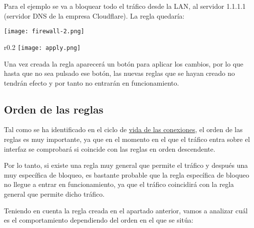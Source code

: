 Para el ejemplo se va a bloquear todo el tráfico desde la LAN, al servidor 1.1.1.1 (servidor DNS de la empresa Cloudflare). La regla quedaría:

\begin{center}
    \vspace{-10pt}
    \texttt{[image: firewall-2.png]}
    \vspace{-20pt}
\end{center}


\begin{wrapfigure}{r}{0.2\linewidth}
    \centering
    \vspace{-10pt}
    \texttt{[image: apply.png]}
\end{wrapfigure}
Una vez creada la regla aparecerá un botón para aplicar los cambios, por lo que hasta que no sea pulsado ese botón, las nuevas reglas que se hayan creado no tendrán efecto y por tanto no entrarán en funcionamiento.


\subsection{Orden de las reglas}
Tal como se ha identificado en el ciclo de \hyperlink{ciclo_vida_conexiones}{vida de las conexiones}, el orden de las reglas es muy importante, ya que en el momento en el que el tráfico entra sobre el interfaz se comprobará si coincide con las reglas en orden descendente.

Por lo tanto, si existe una regla muy general que permite el tráfico y después una muy específica de bloqueo, es bastante probable que la regla específica de bloqueo no llegue a entrar en funcionamiento, ya que el tráfico coincidirá con la regla general que permite dicho tráfico.

Teniendo en cuenta la regla creada en el apartado anterior, vamos a analizar cuál es el comportamiento dependiendo del orden en el que se sitúa:

